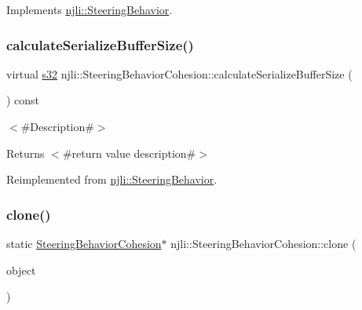 Implements \mbox{\hyperlink{classnjli_1_1_steering_behavior_a9720953de1268f658636213946d76ed3}{njli\+::\+Steering\+Behavior}}.

\mbox{\label{classnjli_1_1_steering_behavior_cohesion_ac7807575daa40083f0e1c648da155f93}} 
\subsubsection{\texorpdfstring{calculate\+Serialize\+Buffer\+Size()}{calculateSerializeBufferSize()}}
{\footnotesize\ttfamily virtual \mbox{\hyperlink{_util_8h_aa62c75d314a0d1f37f79c4b73b2292e2}{s32}} njli\+::\+Steering\+Behavior\+Cohesion\+::calculate\+Serialize\+Buffer\+Size (\begin{DoxyParamCaption}{ }\end{DoxyParamCaption}) const\hspace{0.3cm}{\ttfamily [virtual]}}

$<$\#\+Description\#$>$

\begin{DoxyReturn}{Returns}
$<$\#return value description\#$>$ 
\end{DoxyReturn}


Reimplemented from \mbox{\hyperlink{classnjli_1_1_steering_behavior_abbc461d853c1b225cfde5b79d96d11bd}{njli\+::\+Steering\+Behavior}}.

\mbox{\label{classnjli_1_1_steering_behavior_cohesion_ad212794313ea653c1b765366ad423543}} 
\subsubsection{\texorpdfstring{clone()}{clone()}}
{\footnotesize\ttfamily static \mbox{\hyperlink{classnjli_1_1_steering_behavior_cohesion}{Steering\+Behavior\+Cohesion}}$\ast$ njli\+::\+Steering\+Behavior\+Cohesion\+::clone (\begin{DoxyParamCaption}\item[{const \mbox{\hyperlink{classnjli_1_1_steering_behavior_cohesion}{Steering\+Behavior\+Cohesion}} \&}]{object }\end{DoxyParamCaption})\hspace{0.3cm}{\ttfamily [static]}}



